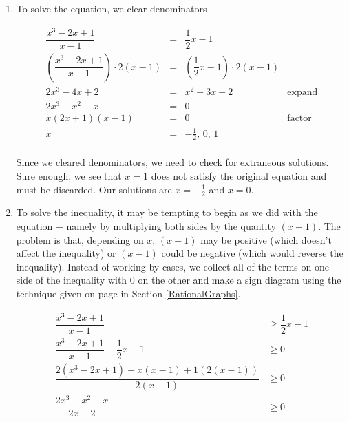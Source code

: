 {
\begin{enumerate}

\item  To solve the equation, we clear denominators

\[ \begin{array}{rclr}

\dfrac{x^3-2x+1}{x-1} & = & \dfrac{1}{2}x-1 & \\ [10pt]

\left(\dfrac{x^3-2x+1}{x-1}\right) \cdot 2(x-1) & = & \left( \dfrac{1}{2}x-1 \right) \cdot 2(x-1) & \\ [10pt]

2x^3 - 4x + 2 & = & x^2-3x+2 & \mbox{expand} \\

2x^3 -x^2 - x & = & 0 & \\

x(2x+1)(x-1) & = & 0 & \mbox{factor}\\

x & = & -\frac{1}{2}, \, 0, \, 1 & \\


\end{array}\]

Since we cleared denominators, we need to check for extraneous solutions.  Sure enough, we see that $x=1$ does not satisfy the original equation and must be discarded.  Our solutions are $x=-\frac{1}{2}$ and $x=0$.

\item  To solve the inequality, it may be tempting to begin as we did with the equation $-$ namely by multiplying both sides by the quantity $(x-1)$.  The problem is that, depending on $x$, $(x-1)$ may be positive (which doesn't affect the inequality) or $(x-1)$ could be negative (which would reverse the inequality).  Instead of working by cases, we collect all of the terms on one side of the inequality with $0$ on the other and make a sign diagram using the technique given on page \pageref{rationalsigndiagram} in Section \ref{RationalGraphs}.

\noindent\hskip-25pt\begin{minipage}{\textwidth}
\begin{align*}
\dfrac{x^3-2x+1}{x-1} & \geq \dfrac{1}{2}x-1  \\ 
\dfrac{x^3-2x+1}{x-1}  - \dfrac{1}{2} x + 1& \geq  0 \\
\dfrac{2\left(x^3-2x+1\right)-x(x-1)+1(2(x-1))}{2(x-1)} & \geq  0  \tag*{get a common denominator} \\ 
\dfrac{2x^3-x^2-x}{2x-2} & \geq  0  \tag*{expand}
\end{align*}
\end{minipage}


\end{enumerate}}

